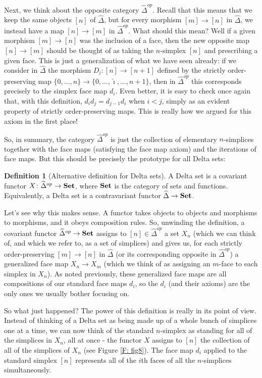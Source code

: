 \documentclass[12pt]{article}
\theoremstyle{plain}
\theoremstyle{definition}
\newtheorem{definition}[theorem]{Definition}
\newcommand{\Set}{\text{\textbf{Set}}}
\begin{document}
Next, we think about the opposite category $\widehat \Delta^{op}$. Recall that this means that we keep the same objects $[n]$ of $\widehat \Delta$, but for every morphism $[m]\to [n]$ in $\widehat \Delta$, we instead have a map $[n]\to [m]$ in $\widehat \Delta^{op}$. What should this mean? Well if a given morphism $[m]\to[n]$ was the inclusion of a face, then the new opposite map $[n]\to[m]$ should be thought of as taking  the $n$-simplex $[n]$ and prescribing a given face. This is just a generalization of what we have seen already: if we consider in $\widehat \Delta$ the morphism $D_i\colon[n]\to [n+1]$ defined by the strictly order-preserving map $\{0,\ldots, n\}\to \{0,\ldots, \hat \imath,\ldots, n+1\}$, then in $\widehat\Delta^{op}$ this corresponds precisely to the simplex face map $d_i$. Even better, it is easy to check once again that, with this definition, $d_id_j=d_{j-1}d_i$ when $i<j$, simply as an evident property of strictly order-preserving maps. This is really how we argued for this axiom in the first place! 


So, in summary, the category $\widehat \Delta^{op}$ is just the collection of elementary $n$-simplices together with the face maps (satisfying the face map axiom) and the iterations of face maps. But this should be precisely the prototype for all Delta sets:

\begin{definition}[Alternative definition for Delta sets]
A Delta set is a covariant functor $X\colon\widehat \Delta^{op}\to \Set$, where $\Set$ is the category of sets and functions. Equivalently, a Delta set is a contravariant functor $\widehat \Delta \to \Set$. 
\end{definition}

Let's see why this makes sense. A functor takes objects to objects and morphisms to morphisms, and it obeys composition rules. So, unwinding the definition, a covariant functor $\widehat \Delta^{op}\to \Set$ assigns to $[n]\in \widehat \Delta^{op}$  a set $X_n$ (which we can think of, and which we refer to, as a set of simplices) and gives us, for each strictly order-preserving $[m]\to [n]$ in $\widehat \Delta$ (or its corresponding opposite in $\widehat \Delta^{op}$) a generalized face map $X_n\to X_m$ (which we think of as assigning an $m$-face to each simplex in $X_n$). As noted previously, these generalized face maps are all compositions of our standard face maps $d_i$, so the $d_i$ (and their axioms) are the only ones we usually bother focusing on.

So what just happened? The power of this definition is really in its point of view. Instead of thinking of a Delta set as being made up of a whole bunch of simplices one at a time, we can now think of the standard $n$-simplex as standing for all of the simplices in $X_n$, all at once - the functor $X$ assigns to $[n]$ the collection of all of the simplices of $X_n$ (see Figure \ref{F: fig8}). The face map $d_i$ applied to the standard simplex $[n]$ represents all of the $i$th faces of all the $n$-simplices simultaneously. 
\end{document}
